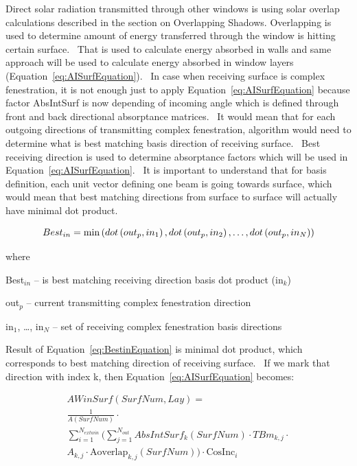 Direct solar radiation transmitted through other windows is using solar overlap calculations described in the section on Overlapping Shadows. Overlapping is used to determine amount of energy transferred through the window is hitting certain surface.~ That is used to calculate energy absorbed in walls and same approach will be used to calculate energy absorbed in window layers (Equation~\ref{eq:AISurfEquation}).~ In case when receiving surface is complex fenestration, it is not enough just to apply Equation~\ref{eq:AISurfEquation} because factor AbsIntSurf is now depending of incoming angle which is defined through front and back directional absorptance matrices.~ It would mean that for each outgoing directions of transmitting complex fenestration, algorithm would need to determine what is best matching basis direction of receiving surface.~ Best receiving direction is used to determine absorptance factors which will be used in Equation~\ref{eq:AISurfEquation}.~ It is important to understand that for basis definition, each unit vector defining one beam is going towards surface, which would mean that best matching directions from surface to surface will actually have minimal dot product.

\begin{equation}
Bes{t_{in}} = {\rm{min}}\left( {dot\left( {ou{t_p},i{n_1}} \right),dot\left( {ou{t_p},i{n_2}} \right), \ldots ,dot\left( {ou{t_p},i{n_N}} \right)} \right)
\label{eq:BestinEquation}
\end{equation}

where

Best\(_{in}\) -- is best matching receiving direction basis dot product (in\(_{k}\))

out\(_{p}\) -- current transmitting complex fenestration direction

in\(_{1}\), \ldots{}, in\(_{N}\) -- set of receiving complex fenestration basis directions

Result of Equation~\ref{eq:BestinEquation} is minimal dot product, which corresponds to best matching direction of receiving surface.~ If we mark that direction with index k, then Equation~\ref{eq:AISurfEquation} becomes:

\begin{equation}
  \begin{array}{l}
    AWinSurf(SurfNum,Lay) = \\
      \frac{1}{A(SurfNum)} \cdot \\
      \sum_{i = 1}^{N_{extwin}} (\sum\limits_{j = 1}^{N_{out}} AbsIntSur{f_k}(SurfNum) \cdot TB{m_{k,j}} \cdot \\
      A_{k,j} \cdot \text{Aoverlap}_{k,j}(SurfNum)) \cdot \text{CosInc}_i
  \end{array}
\end{equation}

